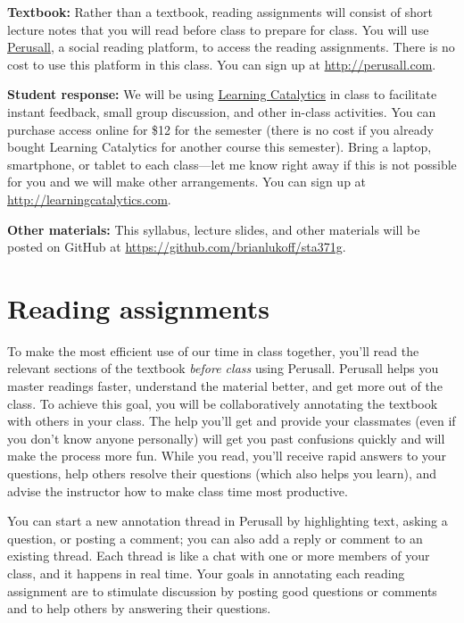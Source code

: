 \documentclass[12pt]{article}
\begin{document}
\textbf{Textbook:} Rather than a textbook, reading assignments will consist of short lecture notes that you will read before class to prepare for class.  You will use \href{http://perusall.com}{Perusall}, a social reading platform, to access the reading assignments. There is no cost to use this platform in this class. You can sign up at \url{http://perusall.com}.

\textbf{Student response:} We will be using \href{http://learningcatalytics.com}{Learning Catalytics} in class to facilitate instant feedback, small group discussion, and other in-class activities.  You can purchase access online for \$12 for the semester (there is no cost if you already bought Learning Catalytics for another course this semester).  Bring a laptop, smartphone, or tablet to each class---let me know right away if this is not possible for you and we will make other arrangements. You can sign up at \url{http://learningcatalytics.com}.

\textbf{Other materials:} This syllabus, lecture slides, and other materials will be posted on GitHub at \url{https://github.com/brianlukoff/sta371g}.

\section*{Reading assignments}

To make the most efficient use of our time in class together, you'll read the relevant sections of the textbook \emph{before class} using Perusall. 
Perusall helps you master readings faster, understand the material better, and get more out of the class. To achieve this goal, you will be collaboratively annotating the textbook with others in your class. The help you'll get and provide your classmates (even if you don't know anyone personally) will get you past confusions quickly and will make the process more fun. While you read, you'll receive rapid answers to your questions, help others resolve their questions (which also helps you learn), and advise the instructor how to make class time most productive. 

You can start a new annotation thread in Perusall by highlighting text, asking a question, or posting a comment; you can also add a reply or comment to an existing thread. Each thread is like a chat with one or more members of your class, and it happens in real time. Your goals in annotating each reading assignment are to stimulate discussion by posting good questions or comments and to help others by answering their questions.
\end{document}

